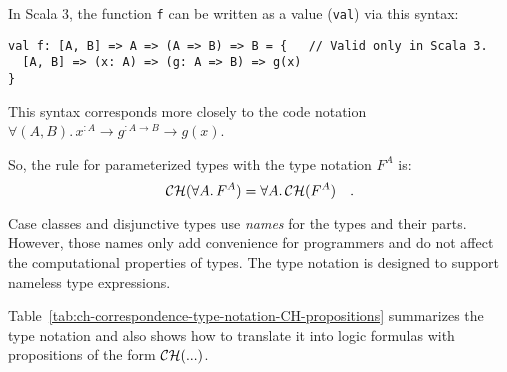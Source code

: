 In Scala 3, the function \lstinline!f! can be written as a value
(\lstinline!val!) via this syntax:
\begin{lstlisting}
val f: [A, B] => A => (A => B) => B = {   // Valid only in Scala 3.
  [A, B] => (x: A) => (g: A => B) => g(x)
}
\end{lstlisting}
This syntax corresponds more closely to the code notation $\forall(A,B).\,x^{:A}\rightarrow g^{:A\rightarrow B}\rightarrow g(x)$.

So, the rule for parameterized types with the type notation $F^{A}$
is:
\[
{\cal CH}(\forall A.\,F^{A})=\forall A.\,{\cal CH}(F^{A})\quad.
\]

Case classes and disjunctive types use \emph{names} for the types
and their parts. However, those names only add convenience for programmers
and do not affect the computational properties of types. The type
notation is designed to support nameless type expressions.

Table~\ref{tab:ch-correspondence-type-notation-CH-propositions}
summarizes the type notation and also shows how to translate it into
logic formulas with propositions of the form ${\cal CH}(...)$.

